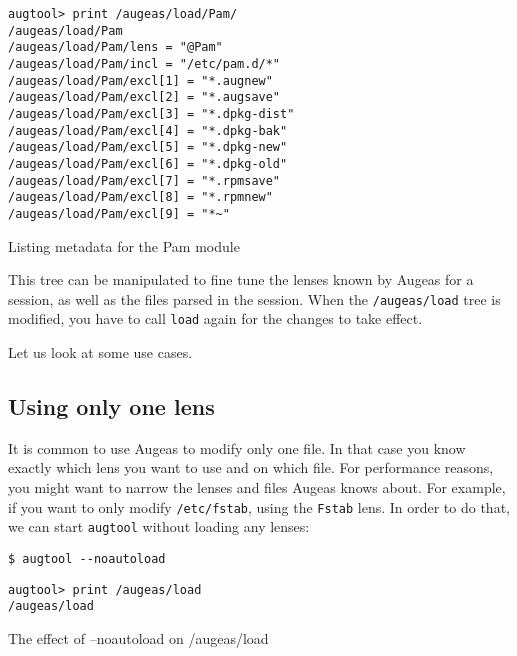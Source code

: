 \begin{listing}
  \begin{verbatim}
augtool> print /augeas/load/Pam/
/augeas/load/Pam
/augeas/load/Pam/lens = "@Pam"
/augeas/load/Pam/incl = "/etc/pam.d/*"
/augeas/load/Pam/excl[1] = "*.augnew"
/augeas/load/Pam/excl[2] = "*.augsave"
/augeas/load/Pam/excl[3] = "*.dpkg-dist"
/augeas/load/Pam/excl[4] = "*.dpkg-bak"
/augeas/load/Pam/excl[5] = "*.dpkg-new"
/augeas/load/Pam/excl[6] = "*.dpkg-old"
/augeas/load/Pam/excl[7] = "*.rpmsave"
/augeas/load/Pam/excl[8] = "*.rpmnew"
/augeas/load/Pam/excl[9] = "*~"
  \end{verbatim}
  \caption{Listing metadata for the Pam module}
  \label{lst:metadata_load_pam}
\end{listing}


This tree can be manipulated to fine tune the lenses known by Augeas for a session, as well as the files parsed in the session. When the \nolinkurl{/augeas/load} tree is modified, you have to call \verb!load! again for the changes to take effect.

Let us look at some use cases.

\subsection{Using only one lens}

It is common to use Augeas to modify only one file. In that case you know exactly which lens you want to use and on which file. For performance reasons, you might want to narrow the lenses and files Augeas knows about. For example, if you want to only modify \nolinkurl{/etc/fstab}, using the \verb!Fstab! lens. In order to do that, we can start \verb!augtool! without loading any lenses:


\begin{listing}
  \begin{verbatim}
$ augtool --noautoload
  \end{verbatim}
  \begin{verbatim}
augtool> print /augeas/load
/augeas/load
  \end{verbatim}
  \caption{The effect of --noautoload on /augeas/load}
  \label{lst:metadata_noautoload}
\end{listing}



